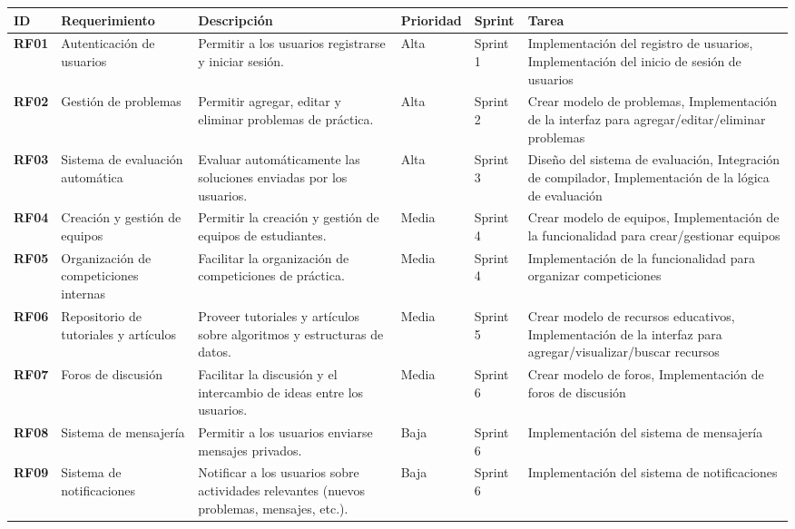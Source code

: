 \begin{longtable}{|p{1.2cm}|p{2.5cm}|p{3cm}|p{1.8cm}|p{1.8cm}|p{2.5cm}|}
\hline
    \textbf{ID} & \textbf{Requerimiento} & \textbf{Descripción} & \textbf{Prioridad} & \textbf{Sprint} & \textbf{Tarea} \\ \hline
    \textbf{RF01} & Autenticación de usuarios & Permitir a los usuarios registrarse y iniciar sesión. & Alta & Sprint 1 & Implementación del registro de usuarios, Implementación del inicio de sesión de usuarios \\ \hline
    \textbf{RF02} & Gestión de problemas & Permitir agregar, editar y eliminar problemas de práctica. & Alta & Sprint 2 & Crear modelo de problemas, Implementación de la interfaz para agregar/editar/eliminar problemas \\ \hline
    \textbf{RF03} & Sistema de evaluación automática & Evaluar automáticamente las soluciones enviadas por los usuarios. & Alta & Sprint 3 & Diseño del sistema de evaluación, Integración de compilador, Implementación de la lógica de evaluación \\ \hline
    \textbf{RF04} & Creación y gestión de equipos & Permitir la creación y gestión de equipos de estudiantes. & Media & Sprint 4 & Crear modelo de equipos, Implementación de la funcionalidad para crear/gestionar equipos \\ \hline
    \textbf{RF05} & Organización de competiciones internas & Facilitar la organización de competiciones de práctica. & Media & Sprint 4 & Implementación de la funcionalidad para organizar competiciones \\ \hline
    \textbf{RF06} & Repositorio de tutoriales y artículos & Proveer tutoriales y artículos sobre algoritmos y estructuras de datos. & Media & Sprint 5 & Crear modelo de recursos educativos, Implementación de la interfaz para agregar/visualizar/buscar recursos \\ \hline
    \textbf{RF07} & Foros de discusión & Facilitar la discusión y el intercambio de ideas entre los usuarios. & Media & Sprint 6 & Crear modelo de foros, Implementación de foros de discusión \\ \hline
    \textbf{RF08} & Sistema de mensajería & Permitir a los usuarios enviarse mensajes privados. & Baja & Sprint 6 & Implementación del sistema de mensajería \\ \hline
    \textbf{RF09} & Sistema de notificaciones & Notificar a los usuarios sobre actividades relevantes (nuevos problemas, mensajes, etc.). & Baja & Sprint 6 & Implementación del sistema de notificaciones \\ \hline
\end{longtable}


